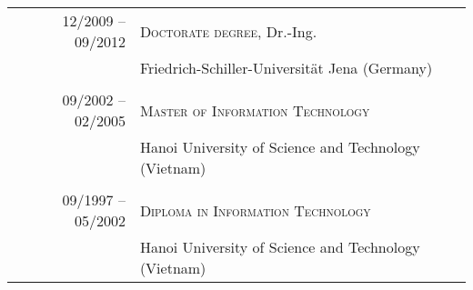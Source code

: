 \documentclass[a4paper,9pt]{article} %
\begin{document}
\begin{tabular}{r|l}	
12/2009 -- 09/2012 							& \textsc{Doctorate degree}, Dr.-Ing. \\
									& Friedrich-Schiller-Universität Jena (Germany) \\


\multicolumn{2}{c}{} \\	%

09/2002 -- 02/2005 							& \textsc{Master of Information Technology}\\
          							& Hanoi University of Science and Technology (Vietnam)\\ 
          					

\multicolumn{2}{c}{} \\	%

09/1997 -- 05/2002 							& \textsc{Diploma in Information Technology}\\
									& Hanoi University of Science and Technology (Vietnam)\\ 
         



\end{tabular}
\end{document}
